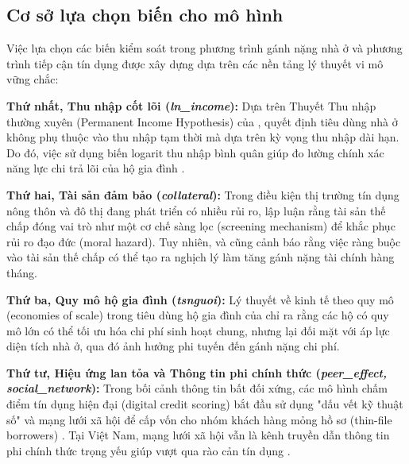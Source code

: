 \documentclass[12pt,a4paper]{report}
\begin{document}
\subsection{Cơ sở lựa chọn biến cho mô hình}

Việc lựa chọn các biến kiểm soát trong phương trình gánh nặng nhà ở và phương trình tiếp cận tín dụng được xây dựng dựa trên các nền tảng lý thuyết vi mô vững chắc:

\textbf{Thứ nhất, Thu nhập cốt lõi (\textit{ln\_income}):} Dựa trên Thuyết Thu nhập thường xuyên (Permanent Income Hypothesis) của \textcite{Friedman1957}, quyết định tiêu dùng nhà ở không phụ thuộc vào thu nhập tạm thời mà dựa trên kỳ vọng thu nhập dài hạn. Do đó, việc sử dụng biến logarit thu nhập bình quân giúp đo lường chính xác năng lực chi trả lõi của hộ gia đình \parencite{Ko2017}.

\textbf{Thứ hai, Tài sản đảm bảo (\textit{collateral}):} Trong điều kiện thị trường tín dụng nông thôn và đô thị đang phát triển có nhiều rủi ro, \textcite{Besley1994} lập luận rằng tài sản thế chấp đóng vai trò như một cơ chế sàng lọc (screening mechanism) để khắc phục rủi ro đạo đức (moral hazard). Tuy nhiên, \textcite{Arrieta2005} và \textcite{sharma2024saving} cũng cảnh báo rằng việc ràng buộc vào tài sản thế chấp có thể tạo ra nghịch lý làm tăng gánh nặng tài chính hàng tháng.

\textbf{Thứ ba, Quy mô hộ gia đình (\textit{tsnguoi}):} Lý thuyết về kinh tế theo quy mô (economies of scale) trong tiêu dùng hộ gia đình của \textcite{Lipton1980} chỉ ra rằng các hộ có quy mô lớn có thể tối ưu hóa chi phí sinh hoạt chung, nhưng lại đối mặt với áp lực diện tích nhà ở, qua đó ảnh hưởng phi tuyến đến gánh nặng chi phí.

\textbf{Thứ tư, Hiệu ứng lan tỏa và Thông tin phi chính thức (\textit{peer\_effect, social\_network}):} Trong bối cảnh thông tin bất đối xứng, các mô hình chấm điểm tín dụng hiện đại (digital credit scoring) bắt đầu sử dụng "dấu vết kỹ thuật số" và mạng lưới xã hội để cấp vốn cho nhóm khách hàng mỏng hồ sơ (thin-file borrowers) \parencite{Berg2020, Yue2022DigitalCredit}. Tại Việt Nam, mạng lưới xã hội vẫn là kênh truyền dẫn thông tin phi chính thức trọng yếu giúp vượt qua rào cản tín dụng \parencite{Nguyen2024}.
\end{document}
